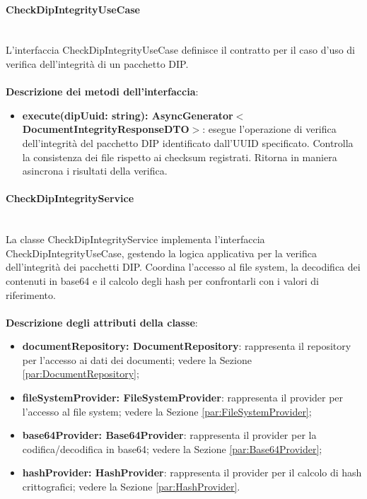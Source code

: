 \documentclass[a4paper,12pt]{article}
\begin{document}
{{                \paragraph{CheckDipIntegrityUseCase}\label{par:CheckDipIntegrityUseCase}\mbox{}\\
                L'interfaccia CheckDipIntegrityUseCase definisce il contratto per il caso d'uso di verifica dell'integrità di un pacchetto DIP.\\
                \\
              \noindent \textbf{Descrizione dei metodi dell'interfaccia}:
                \begin{itemize}
                    \item \textbf{execute(dipUuid: string): AsyncGenerator$<$DocumentIntegrityResponseDTO$>$}: esegue l'operazione di verifica dell'integrità del pacchetto DIP identificato dall'UUID specificato. Controlla la consistenza dei file rispetto ai checksum registrati. Ritorna in maniera asincrona i risultati della verifica.
                \end{itemize}
                \paragraph{CheckDipIntegrityService}\label{par:CheckDipIntegrityService}\mbox{}\\
                La classe CheckDipIntegrityService implementa l'interfaccia CheckDipIntegrityUseCase, gestendo la logica applicativa per la verifica dell'integrità dei pacchetti DIP. Coordina l'accesso al file system, la decodifica dei contenuti in base64 e il calcolo degli hash per confrontarli con i valori di riferimento.\\
                \\
                \textbf{Descrizione degli attributi della classe}:
                \begin{itemize}
                    \item \textbf{documentRepository: DocumentRepository}: rappresenta il repository per l'accesso ai dati dei documenti; vedere la Sezione \ref{par:DocumentRepository};
                    \item \textbf{fileSystemProvider: FileSystemProvider}: rappresenta il provider per l'accesso al file system; vedere la Sezione \ref{par:FileSystemProvider};
                    \item \textbf{base64Provider: Base64Provider}: rappresenta il provider per la codifica/decodifica in base64; vedere la Sezione \ref{par:Base64Provider};
                    \item \textbf{hashProvider: HashProvider}: rappresenta il provider per il calcolo di hash crittografici; vedere la Sezione \ref{par:HashProvider}.
                \end{itemize}
                
}}
\end{document}
